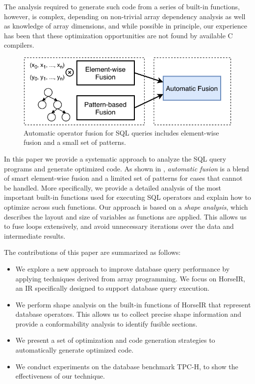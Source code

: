 \noindent{}The analysis required to generate such code from a series of built-in functions, however, is complex,
depending on non-trivial array dependency analysis as well as knowledge of array dimensions, and 
while possible in principle, our experience has been that these optimization opportunities are not found by available C compilers.

\begin{figure}[htbp]
\centering
\includegraphics[width=.9\columnwidth]{./src/figure/basic-idea.pdf}
\caption{Automatic operator fusion for SQL queries includes element-wise fusion and a small set of patterns.}
\label{fig:fusion_idea}
\end{figure}

In this paper we provide a systematic approach to analyze the SQL query programs
and generate optimized code. As shown in ,
\textit{automatic fusion} is a blend of smart element-wise fusion and a limited set of
patterns for cases that cannot be handled. More specifically, we provide a detailed
analysis of the most important built-in functions used for executing SQL operators
and explain how to optimize across such functions. Our approach is based on a
\textit{shape analysis}, which describes the layout and size of variables as
functions are applied. This allows us to fuse loops extensively, and avoid unnecessary
iterations over the data and intermediate results.  

The contributions of this paper are summarized as follows:

\begin{itemize}
\item We explore a new approach to improve database query performance by
      applying techniques derived from array programming. We focus on HorseIR, an IR specifically designed to support database query execution.
\item We perform shape analysis on the built-in functions of HorseIR that represent database operators. This allows us to collect precise shape information and provide a conformability analysis to identify fusible sections. 
\item We present a set of optimization and code generation strategies to automatically
      generate optimized code.
\item We conduct experiments on the database benchmark TPC-H, to show the effectiveness of our technique.
\end{itemize}

